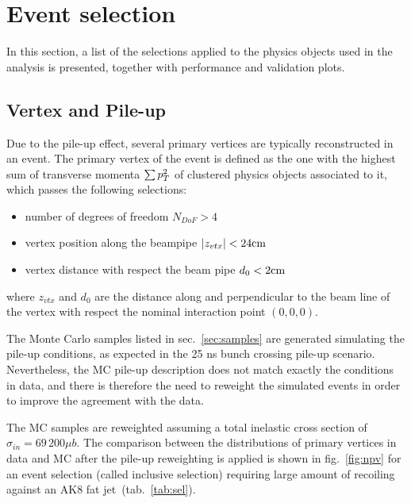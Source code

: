 \section{Event selection}
\label{sec:objects}

In this section, a list of the selections applied to the physics objects used in the analysis is presented, together with performance and validation plots. 

\subsection{Vertex and Pile-up}
Due to the pile-up effect, several primary vertices are typically reconstructed in an event. The primary vertex of the event is defined as the one with the highest sum of transverse momenta $\sum p_T^2$ of clustered physics objects associated to it, which passes the following selections:
\begin{itemize}
  \item number of degrees of freedom $N_{DoF}>4$
  \item vertex position along the beampipe $|z_{vtx}|<24\text{cm}$
  \item vertex distance with respect the beam pipe $d_0<2\text{cm}$
\end{itemize}
where $z_{vtx}$ and $d_0$ are the distance along and perpendicular to the beam line of the vertex with respect the nominal interaction point $(0,0,0)$.

\noindent The Monte Carlo samples listed in sec.~\ref{sec:samples} are generated simulating the pile-up conditions, as expected in the 25 ns bunch crossing pile-up scenario. Nevertheless, the MC pile-up description does not match exactly the conditions in data, and there is therefore the need to reweight the simulated events in order to improve the agreement with the data. 

\noindent The MC samples are reweighted assuming a total inelastic cross section of $\sigma_{in} = 69\,200 \mu b$. The comparison between the distributions of primary vertices in data and MC after the pile-up reweighting is applied is shown in fig.~\ref{fig:npv} for an event selection (called inclusive selection) requiring large amount of \met recoiling against an AK8 fat jet~(tab.~\ref{tab:sel}).
 
